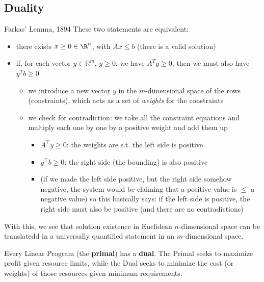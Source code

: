 \documentclass[a4paper, 11pt]{report}
\newcommand{\Rn}{\R^{n}}
\begin{document}
\subsection{Duality}
\begin{thmframe}{Farkas' Lemma, 1894}{}
    These two statements are equivalent:
    \begin{itemize}
        \item there exists $x \geq 0 \in \Rn$, with $Ax \le b$
            \subitem (there is a valid solution)
        \item if, for each vector $y \in \mathbb{R}^m$, $y \ge 0$, we have  $A^T y \ge 0$, then we must also have $y^T b \ge 0$
            \begin{itemize}
                \item we introduce a new vector $y$ in the $m$-dimensional space of the rows (constraints), which acts as a set of \textit{weights} for the constraints
                \item we check for contradiction: we take all the constraint equations and multiply each one by one by a positive weight and add them up
                    \begin{itemize}
                        \item $A^\top  y \geq 0$: the weights are s.t. the left side is positive
                        \item $y^\top  b \geq 0$: the right side (the bounding) is also positive
                        \item (if we made the left side positive, but the right side somehow negative, the system would be claiming that a positive value is $\le$ a negative value)
                            \subitem so this basically says: if the left side is positive, the right side must also be positive (and there are no contradictions)
                    \end{itemize}
            \end{itemize}
    \end{itemize}
\end{thmframe}

With this, we see that solution existence in Euclidean $n$-dimensional space can be translatedd in a universally quantified statement in an $m$-dimensional space.

\begin{gframe}{}
Every Linear Program (the \textbf{primal}) has a \textbf{dual}. The Primal seeks to maximize profit given resource limits, while the Dual seeks to minimize the cost (or weights) of those resources given minimum requirements.
\end{gframe}
\end{document}

